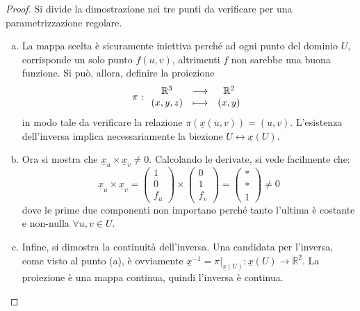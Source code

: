 \documentclass[12pt]{scrartcl}
\theoremstyle{style}
\numberwithin{equation}{subsection}
\begin{document}
\begin{proof}
	Si divide la dimostrazione nei tre punti da verificare per una parametrizzazione regolare.
	\begin{enumerate}[(a).]
		\item La mappa scelta \`e sicuramente iniettiva perch\'e ad ogni punto del dominio $U$, corrisponde un solo punto $f(u,v)$, altrimenti $f$ non sarebbe una buona funzione.
			Si pu\`o, allora, definire la proiezione 
			\[
				\pi : 
			\begin{array}
				{c c c}
				\mathbb{R}^3& \longrightarrow& \mathbb{R}^2\\
				(x,y,z) &\longmapsto & (x,y)
			\end{array}
			\] 
		in modo tale da verificare la relazione $\pi(\underline{x}(u,v)) = (u,v)$.
		L'esistenza dell'inversa implica necessariamente la biezione $U \longleftrightarrow \underline{x}(U)$.
	\item Ora si mostra che $\underline{x}_u \times \underline{x}_v \neq 0$. 
		Calcolando le derivate, si vede facilmente che:
		\[
		\underline{x}_u \times \underline{x}_v = \begin{pmatrix} 1 \\ 0 \\ f_u  \end{pmatrix} \times \begin{pmatrix} 0 \\ 1 \\ f_v \end{pmatrix} = \begin{pmatrix} * \\ *\\ 1 \end{pmatrix} \neq 0
		\] 
		dove le prime due componenti non importano perch\'e tanto l'ultima \`e costante e non-nulla $\forall u,v \in U$.
\item Infine, si dimostra la continuit\`a dell'inversa. 
	Una candidata per l'inversa, come visto al punto (a), \`e ovviamente $\underline{x}^{-1} = \pi|_{\underline{x}(U)}  : \underline{x}(U) \to \mathbb{R}^2$.
	La proiezione \`e una mappa continua, quindi l'inversa \`e continua.
	\end{enumerate}
\end{proof}
\end{document}

